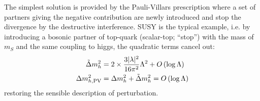 The simplest solution is provided by the Pauli-Villars prescription where a set of partners giving the negative contribution are newly introduced and stop the divergence by the destructive interference. SUSY is the typical example, i.e. by introducing a bosonic partner of top-quark (scalar-top; ``stop'') with the mass of $m_S$ and the same coupling to higgs, the quadratic terms cancel out:
\begin{align}
\tilde{\Delta} m_h ^2 & =  2 \times \frac{3|\lambda|^2}{16\pi^2} \Lambda^2 + O\,(\log\Lambda) \nonumber \\
\Delta m^2_{h, \mathrm{PV}} 
&  = \Delta m_h ^2 + \tilde{\Delta} m_h ^2  = O\,(\log\Lambda)
\label{eq::naturalness2}
\end{align}
restoring the sensible description of perturbation. \\



